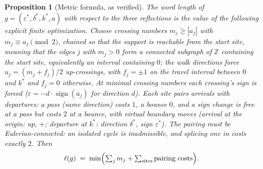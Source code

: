 \documentclass[11pt]{article}
\theoremstyle{plain}
\newtheorem{proposition}[theorem]{Proposition}
\theoremstyle{definition}
\theoremstyle{remark}
\begin{document}
\begin{proposition}[Metric formula, as verified]
\label{thm:metric-formula}
The word length of $g=(\varepsilon^*,\delta^*,k^*,a)$ with respect to the three
reflections is the value of the following explicit finite optimization. Choose
crossing numbers $m_j\ge|a_j|$ with $m_j\equiv a_j\pmod2$, chained so that the
support is reachable from the start site, meaning that the edges $j$ with
$m_j>0$ form a connected subgraph of $\mathbb{Z}$ containing the start site,
equivalently an interval containing $0$; the walk directions force
$u_j=(m_j+f_j)/2$ up-crossings, with $f_j=\pm1$ on the travel interval between
$0$ and $k^*$ and $f_j=0$ otherwise. At minimal crossing numbers each
crossing's sign is forced ($\varepsilon=-d\cdot\operatorname{sign}(a_j)$ for
direction $d$). Each site pairs arrivals with departures: a pass (same
direction) costs $1$, a bounce $0$, and a sign change is free at a pass but
costs $2$ at a bounce, with virtual boundary moves (arrival at the origin: up,
$+$; departure at $k^*$: direction $\delta^*$, sign $\varepsilon^*$). The
pairing must be Eulerian-connected: an isolated cycle is inadmissible, and
splicing one in costs exactly $2$. Then
\[
\ell(g)\;=\;\min\Bigl(\textstyle\sum_j m_j+\sum_{\text{sites}}
\text{pairing costs}\Bigr).
\]
\end{proposition}
\end{document}
